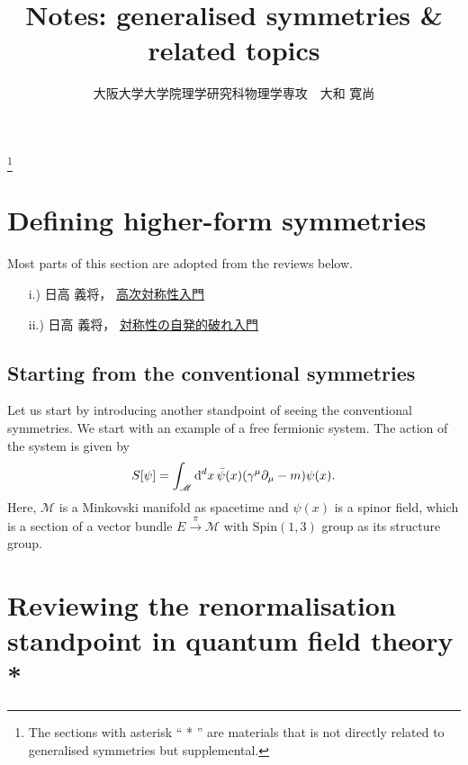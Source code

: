 \documentclass{article}
\title{{\bf Notes: generalised symmetries \& related topics}}
\author{大阪大学大学院理学研究科物理学専攻　大和 寛尚}
\date{}
\theoremstyle{definition}
\numberwithin{equation}{section}
\begin{document}
\maketitle

\tableofcontents
\footnote{The sections with asterisk `` * '' are materials that is not directly related to generalised symmetries but supplemental.}

\section{Defining higher-form symmetries}
Most parts of this section are adopted from the reviews below.
\begin{enumerate}
\item [i.)] 日高 義将，
\uline{\href{https://ribf.riken.jp/~hidaka/yh/slide/hidaka_higher_form.pdf}{高次対称性入門}}
\item [ii.)] 日高 義将，
\uline{\href{https://ribf.riken.jp/~hidaka/yh/slide/hidaka_symmetry.pdf}{対称性の自発的破れ入門}}
\end{enumerate}

\subsection{Starting from the conventional symmetries}
Let us start by introducing another standpoint of seeing the conventional symmetries. We start with an example of a free fermionic system. The action of the system is given by
\begin{align}
  S[\psi] = \int_{\mathscr{M}} \dd^d x\, \bar{\psi}(x) \qty(\gamma^\mu\partial_\mu - m) \psi(x).
\end{align}
Here, $\mathscr{M}$ is a Minkovski manifold as spacetime and $\psi(x)$ is a spinor field, which is a section of a vector bundle $E \xrightarrow{\,\,\pi\,\,} \mathscr{M}$ with $\mathrm{Spin(1,3)}$ group as its structure group.

\section{Reviewing the renormalisation standpoint in quantum field theory *}
\end{document}
